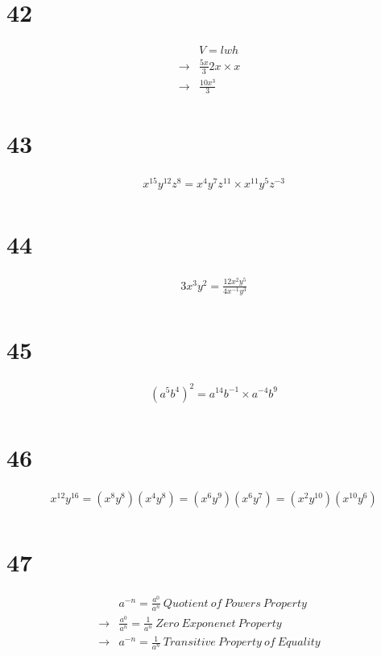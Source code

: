 \documentclass{article}
\theoremstyle{definition}
\begin{document}
\section*{42}
\[
\begin{array}{rl}
            & V=lwh \\
\rightarrow & \frac{5x}{3}2x\times x \\
\rightarrow & \frac{10x^3}{3}
\end{array}
\]

\section*{43}
\[
\begin{array}{rl}
            & x^{15}y^{12}z^8=x^4y^7z^{11}\times x^{11}y^5z^{-3} \\
\end{array}
\]

\section*{44}
\[
\begin{array}{rl}
            & 3x^3y^2=\frac{12x^2y^5}{4x^{-1}y^3} \\
\end{array}
\]

\section*{45}
\[
\begin{array}{rl}
            & (a^5b^4)^2=a^{14}b^{-1}\times a^{-4}b^9 \\
\end{array}
\]

\section*{46}
\[
\begin{array}{rl}
            & x^{12}y^{16}=(x^8y^8)(x^4y^8)=(x^6y^9)(x^6y^7)=(x^2y^{10})(x^{10}y^6) \\
\end{array}
\]

\section*{47}
\[
\begin{array}{rl}
            & a^{-n}=\frac{a^0}{a^n}\  Quotient\ of\ Powers\ Property \\
\rightarrow & \frac{a^0}{a^n}=\frac{1}{a^n}\  Zero\ Exponenet\ Property \\
\rightarrow & a^{-n}=\frac{1}{a^n}\  Transitive\ Property\ of\ Equality \\
\end{array}
\]
\end{document}

